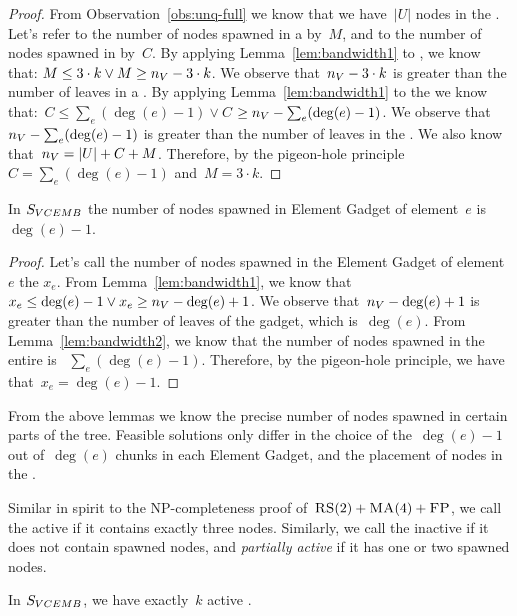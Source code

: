 \begin{proof}
  From Observation~\ref{obs:unq-full} we know that we have~$|U|$ nodes
  in the {\UnqSubtree}. Let's refer to the number of nodes spawned in
  a {\MatchSubtree} by~$M$, and to the number of nodes spawned in
  {\CoverSubtree} by~$C$. By applying Lemma~\ref{lem:bandwidth1} to
  {\MatchSubtree}, we know that: $ M \leq 3\cdot k \vee M \geq n_V - 3\cdot k$.
  We observe that~$n_V - 3\cdot k$ is greater than the number of
  leaves in a {\MatchSubtree}.  By applying Lemma~\ref{lem:bandwidth1}
  to the {\CoverSubtree} we know that:~$ C \leq \sum_e(\deg(e)-1) \vee C$ $\geq n_V - \sum_e(\deg(e)-1)$.
  We observe that~$n_V - \sum_e(\deg(e)-1)$ is greater than the number
  of leaves in the {\CoverSubtree}.
  We also know that~$n_V = |U| + C + M$. Therefore, by the pigeon-hole principle
 ~$C = \sum_e(\deg(e)-1)$ and~$M = 3\cdot k$.
\end{proof}


\begin{lemma}
  In $S_{VCEMB}$ the number of nodes spawned in Element Gadget of
  element~$e$ is~$\deg(e)-1$.
  \label{lem:bandwidth3}
\end{lemma}

\begin{proof}
  Let's call the number of nodes spawned in the Element Gadget of
  element~$e$ the $x_e$.  From Lemma~\ref{lem:bandwidth1}, we know that
 ~$x_e \leq \deg(e) - 1 \vee x_e \geq n_V - \deg(e) + 1$. We observe
  that~$n_V - \deg(e) + 1$ is greater than the number of leaves of the
  gadget, which is~$\deg(e)$.  From Lemma~\ref{lem:bandwidth2}, we know
  that the number of nodes spawned in the entire {\CoverSubtree} is
 ~$\sum_e (\deg(e)-1)$. Therefore, by the pigeon-hole principle, we have
  that~$x_e = \deg(e)-1$.
\end{proof}

From the above lemmas we know the precise number of nodes spawned in
certain parts of the tree. Feasible solutions only differ in 
the choice of the~$\deg(e) - 1$ out of~$\deg(e)$ chunks
in each Element Gadget, and the placement of nodes in the
{\MatchSubtree}.



Similar in spirit to the NP-completeness proof of~$\textsc{RS}(2)+\textsc{MA}(4)+\textsc{FP}$,
we call the {\TripleGadget} active if it contains exactly three nodes. 
Similarly, we call the {\TripleGadget} inactive if it
does not contain spawned nodes, and \emph{partially active} if it
has one or two
spawned nodes.

\begin{lemma}
  In $S_{VCEMB}$, we have exactly~$k$ active
  {\TripleGadgets}.
  \label{lem:full-or-empty}
\end{lemma}

